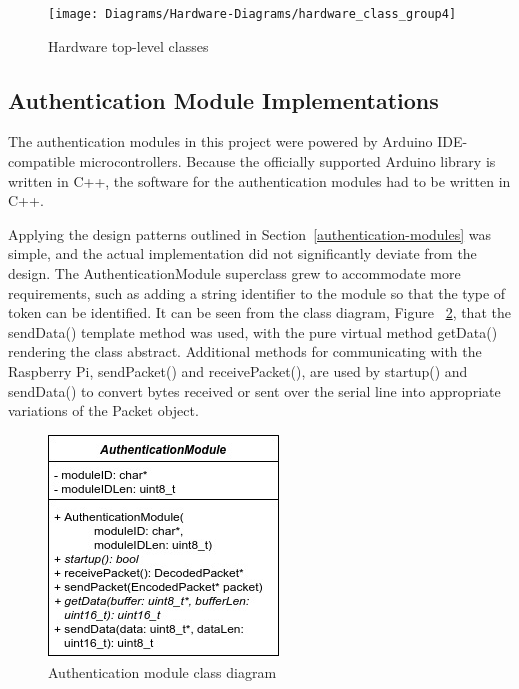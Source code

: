 \documentclass[12pt]{report}
\let\Oldsubsection\subsection
\renewcommand{\subsection}{\FloatBarrier\Oldsubsection}
\begin{document}
\begin{figure}
    \texttt{[image: Diagrams/Hardware-Diagrams/hardware\_class\_group4]}
    \caption{Hardware top-level classes}
    \label{fig:hardware-class-group4}
\end{figure}

\subsection{Authentication Module Implementations} \label{authentication-modules-implementations}

The authentication modules in this project were powered by Arduino IDE-compatible microcontrollers. Because the 
officially supported Arduino library is written in C++, the software for the authentication modules had to be written 
in C++.

Applying the design patterns outlined in Section~\ref{authentication-modules} was simple, and the actual implementation 
did not significantly deviate from the design. The AuthenticationModule superclass grew to accommodate more 
requirements, such as adding a string identifier to the module so that the type of token can be identified. It can be 
seen from the class diagram, Figure ~\ref{fig:authentication-module-class-diagram}, that the sendData() template method 
was used, with the pure virtual method getData() rendering the class abstract. Additional methods for communicating 
with the Raspberry Pi, sendPacket() and receivePacket(), are used by startup() and sendData() to convert bytes received 
or sent over the serial line into appropriate variations of the Packet object.

\begin{figure}
    \centering
    \includegraphics{Diagrams/Hardware-Diagrams/authenticationmodule_class}
    \caption{Authentication module class diagram}
    \label{fig:authentication-module-class-diagram}
\end{figure}
\end{document}
